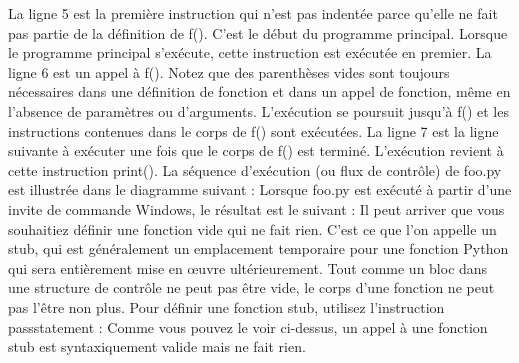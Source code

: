 La ligne 5 est la première instruction qui n'est pas indentée parce qu'elle ne fait pas partie de la définition de f(). C'est le début du programme principal.  Lorsque le programme principal s'exécute, cette instruction est exécutée en premier.
La ligne 6 est un appel à f(). Notez que des parenthèses vides sont toujours nécessaires dans une définition de fonction et dans un appel de fonction, même en l'absence de paramètres ou d'arguments. L'exécution se poursuit jusqu'à f() et les instructions contenues dans le corps de f() sont exécutées.
La ligne 7 est la ligne suivante à exécuter une fois que le corps de f() est terminé. L'exécution revient à cette instruction print().
La séquence d'exécution (ou flux de contrôle) de foo.py est illustrée dans le diagramme suivant :
Lorsque foo.py est exécuté à partir d'une invite de commande Windows, le résultat est le suivant :
Il peut arriver que vous souhaitiez définir une fonction vide qui ne fait rien.  C'est ce que l'on appelle un stub, qui est généralement un emplacement temporaire pour une fonction Python qui sera entièrement mise en œuvre ultérieurement.  Tout comme un bloc dans une structure de contrôle ne peut pas être vide, le corps d'une fonction ne peut pas l'être non plus.  Pour définir une fonction stub, utilisez l'instruction passstatement :
Comme vous pouvez le voir ci-dessus, un appel à une fonction stub est syntaxiquement valide mais ne fait rien.
